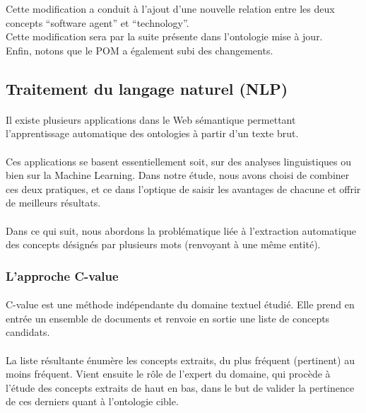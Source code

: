 \documentclass[12pt, a4paper, oneside]{book}
\begin{document}
Cette modification a conduit à l'ajout d'une nouvelle relation entre les deux concepts “software agent” et “technology”.\\


Cette modification sera par la suite présente dans l'ontologie mise à jour.\\
Enfin, notons que le POM a également subi des changements.


\subsection{Traitement du langage naturel (NLP)}
\paragraph{}
Il existe plusieurs applications dans le Web sémantique permettant l'apprentissage automatique des ontologies à partir d'un texte brut.
\paragraph{}
Ces applications se basent essentiellement soit, sur des analyses linguistiques ou bien sur la Machine Learning.
Dans notre étude, nous avons choisi de combiner ces deux pratiques, et ce dans l'optique de saisir les avantages de chacune et offrir de meilleurs résultats.\citep{nlp}
\paragraph{}
Dans ce qui suit, nous abordons la problématique liée à l'extraction automatique des concepts désignés par plusieurs mots (renvoyant à une même entité).


\subsubsection{L'approche C-value}
\paragraph{}
C-value est une méthode indépendante du domaine textuel étudié. Elle prend en entrée un ensemble de documents et renvoie en sortie une liste de concepts candidats.
\paragraph{}
La liste résultante énumère les concepts extraits, du plus fréquent (pertinent) au moins fréquent. Vient ensuite le rôle de l'expert du domaine, qui procède à l'étude des concepts extraits de haut en bas, dans le but de valider la pertinence de ces derniers quant à l'ontologie cible.
\end{document}
